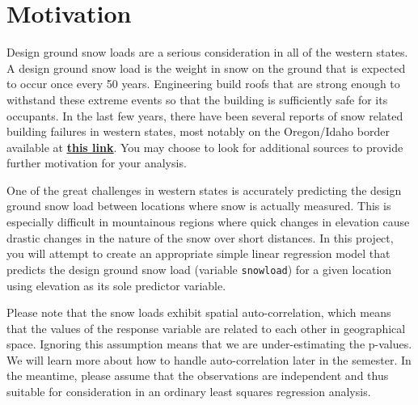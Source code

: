 \documentclass[12pt]{notes}
\begin{document}

\section*{Motivation}

Design ground snow loads are a serious consideration in all of the western states. A design ground snow load is the weight in snow on the ground that is expected to occur once every 50 years. Engineering build roofs that are strong enough to withstand these extreme events so that the building is sufficiently safe for its occupants. In the last few years, there have been several reports of snow related building failures in western states, most notably on the Oregon/Idaho border available at  \href{https://www.washingtonpost.com/news/morning-mix/wp/2017/01/26/a-lot-of-scared-people-relentless-snow-collapses-hundreds-of-roofs-in-idaho-devastates-rural-county/}{\underline{\textbf{this link}}}. You may choose to look for additional sources to provide further motivation for your analysis. 

One of the great challenges in western states is accurately predicting the design ground snow load between locations where snow is actually measured. This is especially difficult in mountainous regions where quick changes in elevation cause drastic changes in the nature of the snow over short distances. In this project, you will attempt to create an appropriate simple linear regression model that predicts the design ground snow load (variable \texttt{snowload}) for a given location using elevation as its sole predictor variable. 

Please note that the snow loads exhibit spatial auto-correlation, which means that the values of the response variable are related to each other in geographical space. Ignoring this assumption means that we are under-estimating the p-values. We will learn more about how to handle auto-correlation later in the semester. In the meantime, please assume that the observations are independent and thus suitable for consideration in an ordinary least squares regression analysis. 
\end{document}
